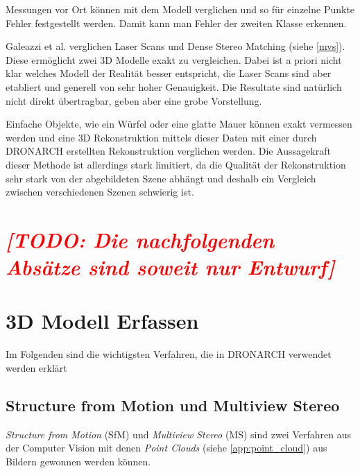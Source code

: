 \documentclass{paper}
\begin{document}
				Messungen vor Ort können mit dem Modell verglichen und so für einzelne Punkte Fehler festgestellt werden. Damit kann man Fehler der zweiten Klasse erkennen.
				
				Galeazzi et al. \cite{arch:laser_vs_dense_stereo} verglichen Laser Scans und Dense Stereo Matching (siehe \autoref{mvs}). Diese ermöglicht zwei 3D Modelle exakt zu vergleichen. Dabei ist a priori nicht klar welches Modell der Realität besser entspricht, die Laser Scans sind aber etabliert und generell von sehr hoher Genauigkeit. Die Resultate sind natürlich nicht direkt übertragbar, geben aber eine grobe Vorstellung.
				
				Einfache Objekte, wie ein Würfel oder eine glatte Mauer können exakt vermessen werden und eine 3D Rekonstruktion mittels dieser Daten mit einer durch DRONARCH erstellten Rekonstruktion verglichen werden.
				Die Aussagekraft dieser Methode ist allerdings stark limitiert, da die Qualität der Rekonstruktion sehr stark von der abgebildeten Szene abhängt und deshalb ein Vergleich zwischen verschiedenen Szenen schwierig ist.
				
			
			
			
				
	\section*{\textcolor{red}{\emph{[TODO: Die nachfolgenden Absätze sind soweit nur Entwurf]}}}
	
			
	\section{3D Modell Erfassen}\label{scan_methods}
		Im Folgenden sind die wichtigsten Verfahren, die in DRONARCH verwendet werden erklärt
		
		\subsection{Structure from Motion und Multiview Stereo}
			\emph{Structure from Motion} (SfM) und \emph{Multiview Stereo} (MS) sind zwei Verfahren aus der Computer Vision mit denen \emph{Point Clouds} (siehe \autoref{app:point_cloud}) aus Bildern gewonnen werden können.
		
\end{document}
